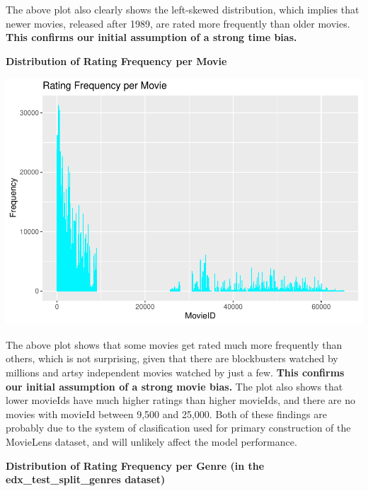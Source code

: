 \documentclass[
]{article}
\begin{document}
The above plot also clearly shows the left-skewed distribution, which
implies that newer movies, released after 1989, are rated more
frequently than older movies. \textbf{This confirms our initial
assumption of a strong time bias.}

\newpage

\textbf{Distribution of Rating Frequency per Movie}

\begin{center}\includegraphics{MovieLens-Report_MitjaPrah_files/figure-latex/unnamed-chunk-26-1} \end{center}

The above plot shows that some movies get rated much more frequently
than others, which is not surprising, given that there are blockbusters
watched by millions and artsy independent movies watched by just a few.
\textbf{This confirms our initial assumption of a strong movie bias.}
The plot also shows that lower movieIds have much higher ratings than
higher movieIds, and there are no movies with movieId between 9,500 and
25,000. Both of these findings are probably due to the system of
clasification used for primary construction of the MovieLens dataset,
and will unlikely affect the model performance.

\newpage

\textbf{Distribution of Rating Frequency per Genre (in the
edx\_test\_split\_genres dataset)}
\end{document}
